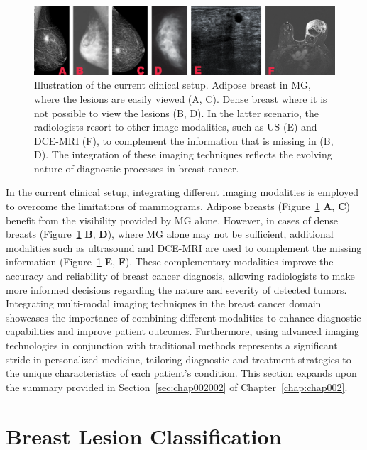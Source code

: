 \begin{figure}[htbp]
\centering
\includegraphics[width=\columnwidth]{images/fig005}
\caption{Illustration of the current clinical setup. Adipose breast in MG, where the lesions are easily viewed (A, C). Dense breast where it is not possible to view the lesions (B, D). In the latter scenario, the radiologists resort to other image modalities, such as US (E) and DCE-MRI (F), to complement the information that is missing in (B, D). The integration of these imaging techniques reflects the evolving nature of diagnostic processes in breast cancer.}
\label{fig:fig005}
\end{figure}

In the current clinical setup, integrating different imaging modalities is employed to overcome the limitations of mammograms.
Adipose breasts (Figure~\ref{fig:fig005} {\bf A}, {\bf C}) benefit from the visibility provided by \ac{MG} alone.
However, in cases of dense breasts (Figure~\ref{fig:fig005} {\bf B}, {\bf D}), where \ac{MG} alone may not be sufficient, additional modalities such as ultrasound and \ac{DCE-MRI} are used to complement the missing information (Figure~\ref{fig:fig005} {\bf E}, {\bf F}).
These complementary modalities improve the accuracy and reliability of breast cancer diagnosis, allowing radiologists to make more informed decisions regarding the nature and severity of detected tumors.
Integrating multi-modal imaging techniques in the breast cancer domain showcases the importance of combining different modalities to enhance diagnostic capabilities and improve patient outcomes.
Furthermore, using advanced imaging technologies in conjunction with traditional methods represents a significant stride in personalized medicine, tailoring diagnostic and treatment strategies to the unique characteristics of each patient's condition.
This section expands upon the summary provided in Section~\ref{sec:chap002002} of Chapter~\ref{chap:chap002}.

\section{Breast Lesion Classification}
\label{sec:app001003}

